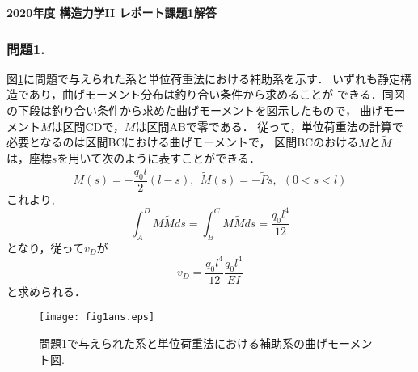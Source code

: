 \documentclass[10pt,a4j]{jarticle}
\newlength{\minitwocolumn}
\begin{document}
\def\Mmaru#1{{\ooalign{\hfil#1\/\hfil\crcr
\raise.167ex\hbox{\mathhexbox 20D}}}}


\newcommand{\fat}[1]{\mbox{\boldmath $#1$}}
\newcommand{\D}{\partial}

\newcommand{\w}{\omega}
\newcommand{\ga}{\alpha}
\newcommand{\gb}{\beta}
\newcommand{\gx}{\xi}
\newcommand{\gz}{\zeta}
\newcommand{\vhat}[1]{\hat{\fat{#1}}}
\newcommand{\spc}{\vspace{0.7\baselineskip}}
\newcommand{\halfspc}{\vspace{0.3\baselineskip}}

\newcommand{\twofig}[2]
 {
   \begin{figure}[h]
     \begin{minipage}[t]{\minitwocolumn}
         \begin{center}   #1
         \end{center}
     \end{minipage}
         \hspace{\columnsep}
     \begin{minipage}[t]{\minitwocolumn}
         \begin{center} #2
         \end{center}
     \end{minipage}
   \end{figure}
 }
\begin{center}
{\Large \bf 2020年度 構造力学II レポート課題1解答} \\
\end{center}
\subsubsection*{問題1.}
図\ref{fig:fig1}に問題で与えられた系と単位荷重法における補助系を示す．
いずれも静定構造であり，曲げモーメント分布は釣り合い条件から求めることが
できる．同図の下段は釣り合い条件から求めた曲げモーメントを図示したもので，
曲げモーメント$M$は区間CDで，$\tilde M$は区間ABで零である．
従って，単位荷重法の計算で必要となるのは区間BCにおける曲げモーメントで，
区間BCのおける$M$と$\tilde M$は，座標$s$を用いて次のように表すことができる．
\begin{equation}
	M(s)=-\frac{q_0l}{2}(l-s), \ \ \tilde M(s)=-\tilde P s, \ \ (0<s<l)
\end{equation}
これより,
\begin{equation}
	\int_A^D M\tilde Mds= \int_B^CM \tilde Mds=\frac{q_0l^4}{12}
\end{equation}
となり，従って$v_D$が
\begin{equation}
	v_D=\frac{q_0l^4}{12}\frac{q_0l^4}{EI}
\end{equation}
と求められる．
\begin{figure}[h]
	\begin{center}
	\texttt{[image: fig1ans.eps]} 
	\end{center}
	\caption{問題1で与えられた系と単位荷重法における補助系の曲げモーメント図. } 
	\label{fig:fig1}
\end{figure}
\end{document}
